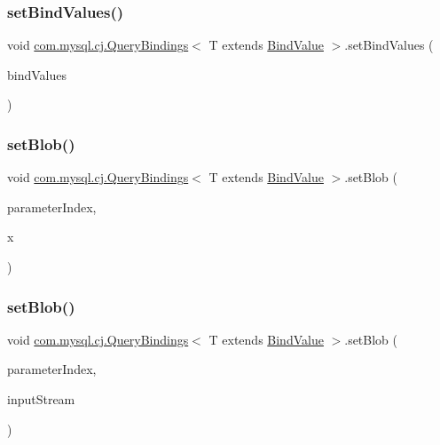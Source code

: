 \subsubsection{\texorpdfstring{set\+Bind\+Values()}{setBindValues()}}
{\footnotesize\ttfamily void \mbox{\hyperlink{interfacecom_1_1mysql_1_1cj_1_1_query_bindings}{com.\+mysql.\+cj.\+Query\+Bindings}}$<$ T extends \mbox{\hyperlink{interfacecom_1_1mysql_1_1cj_1_1_bind_value}{Bind\+Value}} $>$.set\+Bind\+Values (\begin{DoxyParamCaption}\item[{T \mbox{[}$\,$\mbox{]}}]{bind\+Values }\end{DoxyParamCaption})}

\mbox{\label{interfacecom_1_1mysql_1_1cj_1_1_query_bindings_a55c147c4cd989f7533f34e82889f6f07}} 
\subsubsection{\texorpdfstring{set\+Blob()}{setBlob()}\hspace{0.1cm}{\footnotesize\ttfamily [1/3]}}
{\footnotesize\ttfamily void \mbox{\hyperlink{interfacecom_1_1mysql_1_1cj_1_1_query_bindings}{com.\+mysql.\+cj.\+Query\+Bindings}}$<$ T extends \mbox{\hyperlink{interfacecom_1_1mysql_1_1cj_1_1_bind_value}{Bind\+Value}} $>$.set\+Blob (\begin{DoxyParamCaption}\item[{int}]{parameter\+Index,  }\item[{java.\+sql.\+Blob}]{x }\end{DoxyParamCaption})}

\mbox{\label{interfacecom_1_1mysql_1_1cj_1_1_query_bindings_a612b7175f9fd75d62624a40f3f626b19}} 
\subsubsection{\texorpdfstring{set\+Blob()}{setBlob()}\hspace{0.1cm}{\footnotesize\ttfamily [2/3]}}
{\footnotesize\ttfamily void \mbox{\hyperlink{interfacecom_1_1mysql_1_1cj_1_1_query_bindings}{com.\+mysql.\+cj.\+Query\+Bindings}}$<$ T extends \mbox{\hyperlink{interfacecom_1_1mysql_1_1cj_1_1_bind_value}{Bind\+Value}} $>$.set\+Blob (\begin{DoxyParamCaption}\item[{int}]{parameter\+Index,  }\item[{Input\+Stream}]{input\+Stream }\end{DoxyParamCaption})}

